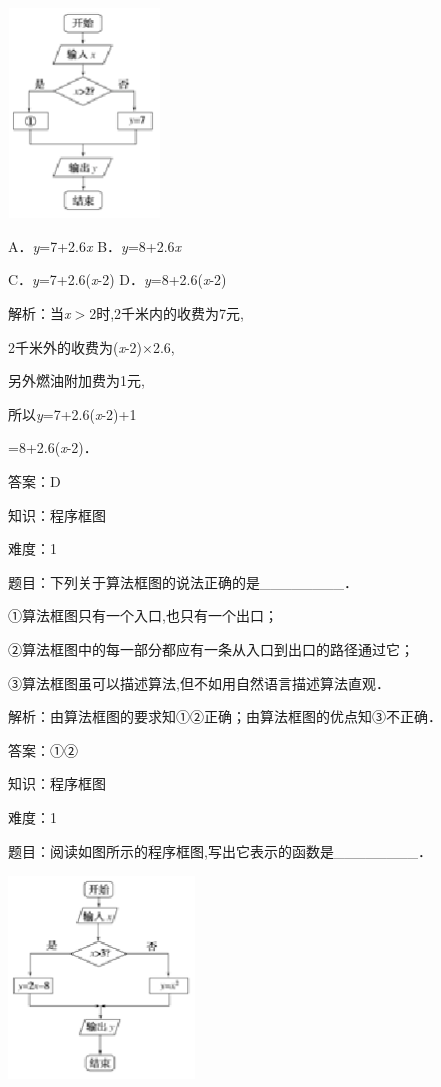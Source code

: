 \documentclass{article} %
\begin{document}
\includegraphics*[width=1.59in, height=2.19in, keepaspectratio=false]{image6}

A．\textit{y}=7+2.6\textit{x}      B．\textit{y}=8+2.6\textit{x}

C．\textit{y}=7+2.6(\textit{x}-2)  D．\textit{y}=8+2.6(\textit{x}-2)

解析：当\textit{x}$\mathrm{>}$2时,2千米内的收费为7元,

2千米外的收费为(\textit{x}-2)$\mathrm{\times}$2.6,

另外燃油附加费为1元,

所以\textit{y}=7+2.6(\textit{x}-2)+1

=8+2.6(\textit{x}-2)．

答案：D

知识：程序框图

难度：1

题目：下列关于算法框图的说法正确的是\_\_\_\_\_\_\_\_．

①算法框图只有一个入口,也只有一个出口；

②算法框图中的每一部分都应有一条从入口到出口的路径通过它；

③算法框图虽可以描述算法,但不如用自然语言描述算法直观．

解析：由算法框图的要求知①②正确；由算法框图的优点知③不正确．

答案：①②

知识：程序框图

难度：1

题目：阅读如图所示的程序框图,写出它表示的函数是\_\_\_\_\_\_\_\_．

\includegraphics*[width=1.95in, height=2.14in, keepaspectratio=false]{image7}
\end{document}
